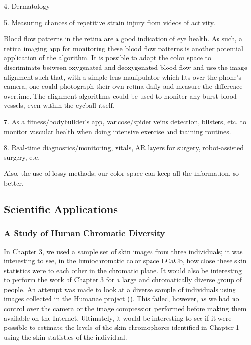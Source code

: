 4. Dermatology.

5. Measuring chances of repetitive strain injury from videos of activity.

Blood flow patterns in the retina are a good indication of eye health. As such, a retina imaging app for monitoring these blood flow patterns is another potential application of the algorithm. It is possible to adapt the color space to discriminate between oxygenated and deoxygenated blood flow and use the image alignment such that, with a simple lens manipulator which fits over the phone's camera, one could photograph their own retina daily and measure the difference overtime. The alignment algorithms could be used to monitor any burst blood vessels, even within the eyeball itself. 

7. As a fitness/bodybuilder's app, varicose/spider veins detection, blisters, etc. to monitor vascular health when doing intensive exercise and training routines.

8. Real-time diagnostics/monitoring, vitals, AR layers for surgery, robot-assisted surgery, etc.

Also, the use of lossy methods; our color space can keep all the information, so better.
 
\subsection{Scientific Applications}\label{sec:ScientificApplications}

\subsubsection{A Study of Human Chromatic Diversity}\label{sec:AStudyOfHumanChromaticDiversity}
In Chapter 3, we used a sample set of skin images from three individuals; it was interesting to see, in the lumiochromatic color space LCaCb, how close these skin statistics were to each other in the chromatic plane. It would also be interesting to perform the work of Chapter 3 for a large and chromatically diverse group of people. An attempt was made to look at a diverse sample of individuals using images collected in the Humanae project (\cite{dass2012}). This failed, however, as we had no control over the camera or the image compression performed before making them available on the Internet. Ultimately, it would be interesting to see if it were possible to estimate the levels of the skin chromophores identified in Chapter 1 using the skin statistics of the individual.


